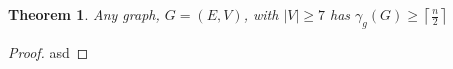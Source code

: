 \documentclass[11pt
              , a4paper
              , twoside
              , openright
              ]{report}
\newtheorem{theorem}{Theorem}
\theoremstyle{definition}
\begin{document}
\begin{theorem} \label{minDomSize}
    Any graph, $G=(E,V)$, with $|V| \geq 7$ has $\gamma_g(G) \geq \left \lceil{\frac{n}{2}}\right \rceil $
\end{theorem}

\begin{proof}
asd    
\end{proof}


\backmatter



%


\end{document}
